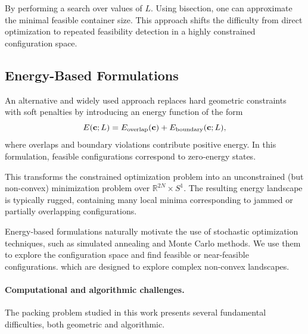 By performing a search over values of $L$. Using bisection,
 one can approximate the minimal feasible container size.
  This approach shifts the difficulty from direct optimization
   to repeated feasibility detection in a highly constrained configuration space.

\subsection{Energy-Based Formulations}

An alternative and widely used approach replaces hard geometric
 constraints with soft penalties by introducing an energy function of the form
\[
E(\mathbf{c};L) = E_{\text{overlap}}(\mathbf{c}) + E_{\text{boundary}}(\mathbf{c};L),
\]
where overlaps and boundary violations contribute positive energy.
 In this formulation, feasible configurations correspond to zero-energy states.

This transforms the constrained optimization problem into an
 unconstrained (but non-convex) minimization problem over
  $\mathbb{R}^{2N} \times S^1$.
  The resulting energy landscape is typically rugged,
   containing many local minima corresponding to jammed or partially 
   overlapping configurations.

Energy-based formulations naturally motivate the use of stochastic optimization techniques,
 such as simulated annealing and Monte Carlo methods. We use them to explore the configuration space
  and find feasible or near-feasible configurations.
   which are designed to explore complex non-convex landscapes.


\paragraph{Computational and algorithmic challenges.}
The packing problem studied in this work presents several fundamental difficulties,
 both geometric and algorithmic.

